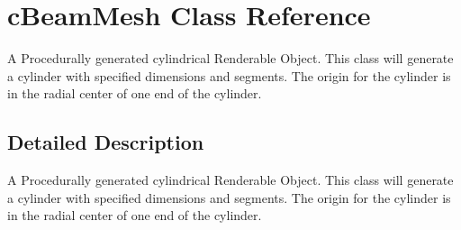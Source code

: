 \hypertarget{classc_beam_mesh}{
\section{cBeamMesh Class Reference}
\label{classc_beam_mesh}
}


A Procedurally generated cylindrical Renderable Object. This class will generate a cylinder with specified dimensions and segments. The origin for the cylinder is in the radial center of one end of the cylinder.  




\subsection{Detailed Description}
A Procedurally generated cylindrical Renderable Object. This class will generate a cylinder with specified dimensions and segments. The origin for the cylinder is in the radial center of one end of the cylinder. 